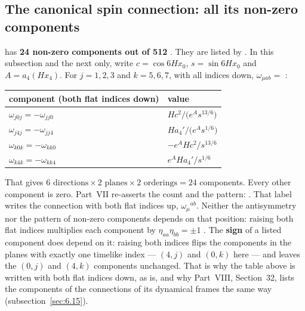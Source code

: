 \subsection{The canonical spin connection: all its non-zero components}
\label{csc:components}\label{sec:6.6}

 has \textbf{24 non-zero components out of 512} .
They are listed by . In this subsection and the
next only, write $c=\cos 6Hx_0$, $s=\sin 6Hx_0$ and $A=a_4(Hx_4)$. For $j=1,2,3$ and $k=5,6,7$,
with all indices down,
$\omega_{\mu ab}=$ :

\begin{center}
\begin{tabular}{@{}ll@{}}
\toprule
component (both flat indices down) & value \\
\midrule
$\omega_{j0j}=-\omega_{jj0}$ & $H c^2\big/\bigl(e^{A}s^{13/6}\bigr)$ \\
$\omega_{j4j}=-\omega_{jj4}$ & $H a_4'\big/\bigl(e^{A}s^{1/6}\bigr)$ \\
$\omega_{k0k}=-\omega_{kk0}$ & $-e^{A}H c^2\big/s^{13/6}$ \\
$\omega_{k4k}=-\omega_{kk4}$ & $e^{A}H a_4'\big/s^{1/6}$ \\
\bottomrule
\end{tabular}
\end{center}

\noindent That gives $6\text{ directions}\times2\text{ planes}\times2\text{ orderings}=24$
components. Every other component is zero.
Part~VII re-asserts the count and the pattern:  .
That label writes the connection with both flat indices up, $\omega_\mu{}^{ab}$. Neither the
antisymmetry nor the pattern of non-zero components depends on that position: raising both flat
indices multiplies each component by $\eta_{aa}\eta_{bb}=\pm1$ \cfderived. The \textbf{sign} of a
listed component does depend on it: raising both indices flips the components in the planes with
exactly one timelike index --- $(4,j)$ and $(0,k)$ here --- and leaves the $(0,j)$ and $(4,k)$
components unchanged. That is why the table above is written with both flat indices down, as
 is, and why Part~VIII, Section~32, lists the components of the connections of
its dynamical frames the same way (subsection~\ref{sec:6.15}).

